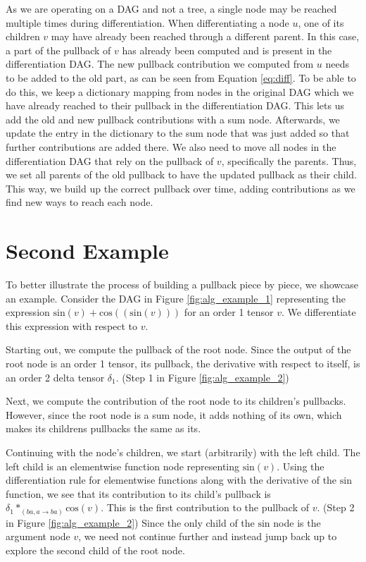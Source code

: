 \documentclass[12pt, a4paper]{report}
\begin{document}
As we are operating on a DAG and not a tree, a single node may be reached multiple times during differentiation.
When differentiating a node $u$, one of its children $v$ may have already been reached through a different parent.
In this case, a part of the pullback of $v$ has already been computed and is present in the differentiation DAG.
The new pullback contribution we computed from $u$ needs to be added to the old part, as can be seen from Equation \ref{eq:diff}.
To be able to do this, we keep a dictionary mapping from nodes in the original DAG which we have already reached to their pullback in the differentiation DAG.
This lets us add the old and new pullback contributions with a sum node.
Afterwards, we update the entry in the dictionary to the sum node that was just added so that further contributions are added there.
We also need to move all nodes in the differentiation DAG that rely on the pullback of $v$, specifically the parents.
Thus, we set all parents of the old pullback to have the updated pullback as their child.
This way, we build up the correct pullback over time, adding contributions as we find new ways to reach each node.

\FloatBarrier
\section{Second Example}
To better illustrate the process of building a pullback piece by piece, we showcase an example.
Consider the DAG in Figure \ref{fig:alg_example_1} representing the expression $\text{sin}(v) + \text{cos}((\text{sin}(v)))$ for an order 1 tensor $v$.
We differentiate this expression with respect to $v$.

Starting out, we compute the pullback of the root node.
Since the output of the root node is an order 1 tensor, its pullback, the derivative with respect to itself, is an order 2 delta tensor $\delta_1$. (Step 1 in Figure \ref{fig:alg_example_2})

Next, we compute the contribution of the root node to its children's pullbacks.
However, since the root node is a sum node, it adds nothing of its own, which makes its childrens pullbacks the same as its.

Continuing with the node's children, we start (arbitrarily) with the left child.
The left child is an elementwise function node representing $\text{sin}(v)$.
Using the differentiation rule for elementwise functions along with the derivative of the $\text{sin}$ function, we see that its contribution to its child's pullback is $\delta_1 *_{(ba,a \rightarrow ba)} \text{cos}(v)$.
This is the first contribution to the pullback of $v$. (Step 2 in Figure \ref{fig:alg_example_2})
Since the only child of the $\text{sin}$ node is the argument node $v$, we need not continue further and instead jump back up to explore the second child of the root node.
\end{document}
